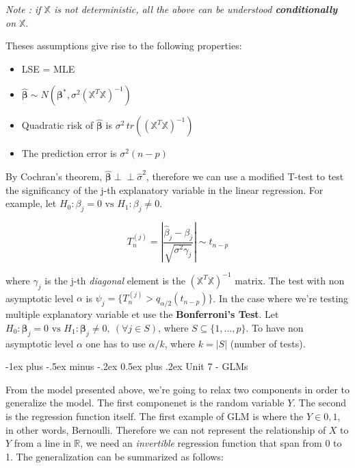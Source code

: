\documentclass[landscape]{article}
\makeatletter
\renewcommand{\section}{\@startsection{section}{1}{0mm}%
                                {-1ex plus -.5ex minus -.2ex}%
                                {0.5ex plus .2ex}%
                                {\normalfont\large\bfseries}}
\makeatother
\begin{document}
\begin{multicols}{3}
\emph{Note : if $\mathbb{X}$ is not deterministic, all the above can be understood \textbf{conditionally} on $\mathbb{X}$}.

Theses assumptions give rise to the following properties:

\begin{itemize}[itemsep=0em]
    \item LSE = MLE
    \item $\widehat{\mathbf{\beta}} \sim N(\mathbf{\beta}^*, \sigma^2 (\mathbb{X}^T \mathbb{X})^{-1})$
    \item Quadratic risk of $\widehat{\mathbf{\beta}}$ is $\sigma^2 \, tr((\mathbb{X}^T \mathbb{X})^{-1})$
    \item The prediction error is $\sigma^2 (n - p)$
\end{itemize}

By Cochran's theorem, $\mathbf{\widehat{\beta}} {\perp \!\!\! \perp} \widehat{\sigma}^2$, therefore we can use a modified 
T-test to test the significancy of the 
j-th explanatory variable in the linear regression. For example, let $H_0: \beta_j = 0 \text{ vs } H_1: \beta_j \ne 0$.

$$ T_{n}^{(j)} = \left| \frac{\widehat{\beta}_j - \beta_j}{\sqrt{\sigma^2 \gamma_j}} \right| \sim t_{n-p}$$

where $\gamma_j$ is the j-th \emph{diagonal} element is the $(\mathbb{X}^T \mathbb{X})^{-1}$ matrix. The test with non asymptotic level $\alpha$ is 
$\psi_{j} = \{ T_n^{(j)} > q_{\alpha/2}(t_{n-p}) \}$. In the case where we're testing multiple explanatory variable et use the \textbf{Bonferroni's Test}.
Let $H_0: \mathbf{\beta}_j = 0 \text{ vs } H_1: \mathbf{\beta}_j \ne 0, \: (\forall j \in S)$, where $S \subseteq \{1, \dots, p\}$. 
To have non asymptotic level $\alpha$
one has to use $\alpha / k$, where $k = |S|$ (number of tests).

\section{Unit 7 - GLMs}

From the model presented above, we're going to relax two components in order to generalize the model. The first componenet is the random variable $Y$.
The second is the regression function itself. The first example of GLM is where the $Y \in {0, 1}$, in other words, Bernoulli. Therefore we can not 
represent the relationship of $X$ to $Y$ from a line in $\mathbb{R}$, we need an \emph{invertible} regression function that span from 0 to 1.
The generalization can be summarized as follows:


\end{multicols}
\end{document}
